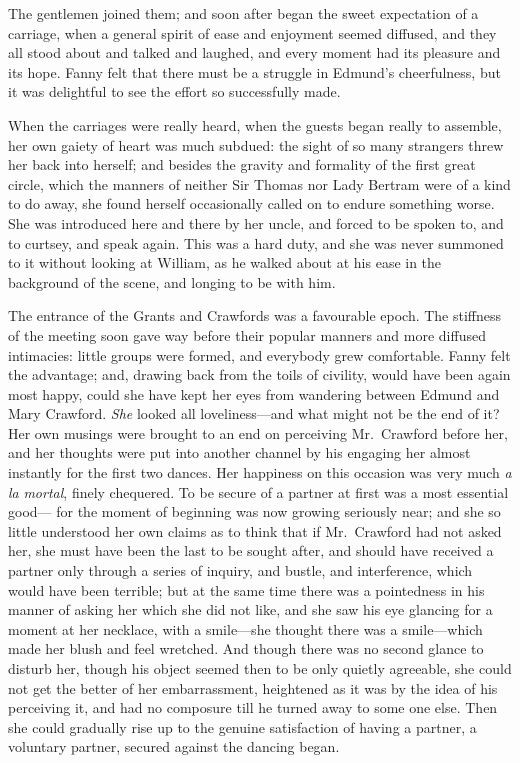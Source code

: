 \documentclass{article}
\begin{document}
The gentlemen joined them; and soon after began the sweet
expectation of a carriage, when a general spirit of ease
and enjoyment seemed diffused, and they all stood about
and talked and laughed, and every moment had its pleasure
and its hope.  Fanny felt that there must be a struggle
in Edmund's cheerfulness, but it was delightful to see
the effort so successfully made.

When the carriages were really heard, when the guests began
really to assemble, her own gaiety of heart was much subdued:
the sight of so many strangers threw her back into herself;
and besides the gravity and formality of the first great circle,
which the manners of neither Sir Thomas nor Lady Bertram
were of a kind to do away, she found herself occasionally
called on to endure something worse.  She was introduced
here and there by her uncle, and forced to be spoken to,
and to curtsey, and speak again.  This was a hard duty,
and she was never summoned to it without looking at William,
as he walked about at his ease in the background of the scene,
and longing to be with him.

The entrance of the Grants and Crawfords was a favourable epoch.
The stiffness of the meeting soon gave way before their
popular manners and more diffused intimacies:  little groups
were formed, and everybody grew comfortable.  Fanny felt
the advantage; and, drawing back from the toils of civility,
would have been again most happy, could she have kept
her eyes from wandering between Edmund and Mary Crawford.
\emph{She} looked all loveliness---and what might not be
the end of it?  Her own musings were brought to an end
on perceiving Mr.\ Crawford before her, and her thoughts
were put into another channel by his engaging her almost
instantly for the first two dances.  Her happiness on this
occasion was very much \emph{a} \emph{la} \emph{mortal}, finely chequered.
To be secure of a partner at first was a most essential good---%
for the moment of beginning was now growing seriously near;
and she so little understood her own claims as to think
that if Mr.\ Crawford had not asked her, she must have been
the last to be sought after, and should have received
a partner only through a series of inquiry, and bustle,
and interference, which would have been terrible; but at
the same time there was a pointedness in his manner of asking
her which she did not like, and she saw his eye glancing
for a moment at her necklace, with a smile---she thought
there was a smile---which made her blush and feel wretched.
And though there was no second glance to disturb her,
though his object seemed then to be only quietly agreeable,
she could not get the better of her embarrassment,
heightened as it was by the idea of his perceiving it,
and had no composure till he turned away to some one else.
Then she could gradually rise up to the genuine satisfaction
of having a partner, a voluntary partner, secured against
the dancing began.
\end{document}
